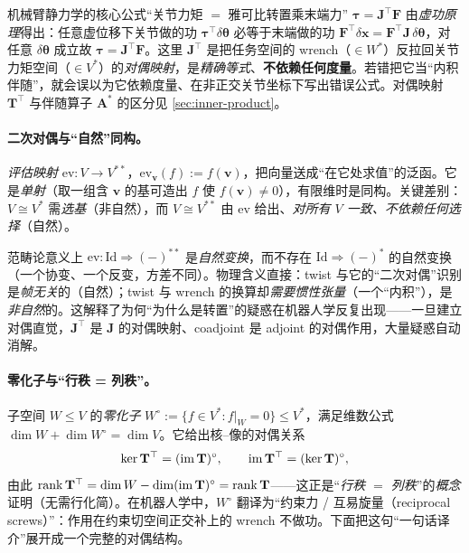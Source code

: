 \begin{example}[$\boldsymbol{\tau}=\mathbf{J}^\top\mathbf{F}$ 是对偶映射，不是伴随]\label{ex:jacobian-transpose}
机械臂静力学的核心公式“关节力矩 $=$ 雅可比转置乘末端力” $\boldsymbol{\tau}=\mathbf{J}^\top\mathbf{F}$ 由\emph{虚功原理}得出：任意虚位移下关节做的功 $\boldsymbol{\tau}^\top\delta\boldsymbol{\theta}$ 必等于末端做的功 $\mathbf{F}^\top\delta\mathbf{x}=\mathbf{F}^\top\mathbf{J}\,\delta\boldsymbol{\theta}$，对任意 $\delta\boldsymbol{\theta}$ 成立故 $\boldsymbol{\tau}=\mathbf{J}^\top\mathbf{F}$。这里 $\mathbf{J}^\top$ 是把任务空间的 wrench（$\in W^*$）反拉回关节力矩空间（$\in V^*$）的\emph{对偶映射}，是\emph{精确等式}、\textbf{不依赖任何度量}。若错把它当“内积伴随”，就会误以为它依赖度量、在非正交关节坐标下写出错误公式。对偶映射 $\mathbf{T}^\top$ 与伴随算子 $\mathbf{A}^*$ 的区分见 \cref{sec:inner-product}。
\end{example}

\paragraph{二次对偶与“自然”同构。}
\emph{评估映射} $\mathrm{ev}:V\to V^{**}$，$\mathrm{ev}_{\mathbf{v}}(f):=f(\mathbf{v})$，把向量送成“在它处求值”的泛函。它是\emph{单射}（取一组含 $\mathbf{v}$ 的基可造出 $f$ 使 $f(\mathbf{v})\neq0$），有限维时是同构。关键差别：$V\cong V^*$ 需\emph{选基}（非自然），而 $V\cong V^{**}$ 由 $\mathrm{ev}$ 给出、\emph{对所有 $V$ 一致、不依赖任何选择}（自然）。

\begin{insight}[“自然”=帧无关，“非自然”=需要度量]
范畴论意义上 $\mathrm{ev}:\mathrm{Id}\Rightarrow(-)^{**}$ 是\emph{自然变换}，而不存在 $\mathrm{Id}\Rightarrow(-)^*$ 的自然变换（一个协变、一个反变，方差不同）。物理含义直接：twist 与它的“二次对偶”识别是\emph{帧无关}的（自然）；twist 与 wrench 的换算却\emph{需要惯性张量}（一个“内积”），是\emph{非自然}的。这解释了为何“为什么是转置”的疑惑在机器人学反复出现——一旦建立对偶直觉，$\mathbf{J}^\top$ 是 $\mathbf{J}$ 的对偶映射、coadjoint 是 adjoint 的对偶作用，大量疑惑自动消解。
\end{insight}

\paragraph{零化子与“行秩 = 列秩”。}
子空间 $W\le V$ 的\emph{零化子} $W^\circ:=\{f\in V^*:f|_W=0\}\le V^*$，满足维数公式 $\dim W+\dim W^\circ=\dim V$。它给出核--像的对偶关系
\begin{equation}
  \ker\mathbf{T}^\top=(\operatorname{im}\mathbf{T})^\circ,\qquad \operatorname{im}\mathbf{T}^\top=(\ker\mathbf{T})^\circ,
  \label{eq:annihilator-duality}
\end{equation}
由此 $\mathrm{rank}\,\mathbf{T}^\top=\dim W-\dim(\operatorname{im}\mathbf{T})^\circ=\mathrm{rank}\,\mathbf{T}$——这正是“\emph{行秩 $=$ 列秩}”的\emph{概念}证明（无需行化简）。在机器人学中，$W^\circ$ 翻译为“约束力 / 互易旋量（reciprocal screws）”：作用在约束切空间正交补上的 wrench 不做功。下面把这句“一句话译介”展开成一个完整的对偶结构。

